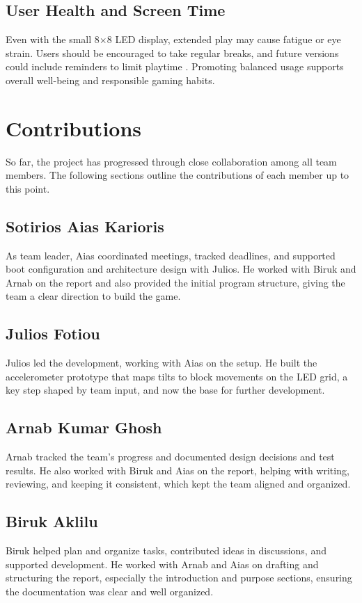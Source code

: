 \documentclass[12pt]{report}
\begin{document}
\section{User Health and Screen Time}
Even with the small 8$\times$8 LED display, extended play may cause fatigue or eye strain. Users should be encouraged to take regular breaks, and future versions could include reminders to limit playtime \cite{king2013videogame}. Promoting balanced usage supports overall well-being and responsible gaming habits.



\chapter{Contributions}
So far, the project has progressed through close collaboration among all team members. The following sections outline the contributions of each member up to this point.

\section{Sotirios Aias Karioris}
As team leader, Aias coordinated meetings, tracked deadlines, and supported boot configuration and architecture design with Julios. He worked with Biruk and Arnab on the report and also provided the initial program structure, giving the team a clear direction to build the game.

\section{Julios Fotiou}
Julios led the development, working with Aias on the setup. He built the accelerometer prototype that maps tilts to block movements on the LED grid, a key step shaped by team input, and now the base for further development.

\section{Arnab Kumar Ghosh}
Arnab tracked the team’s progress and documented design decisions and test results. He also worked with Biruk and Aias on the report, helping with writing, reviewing, and keeping it consistent, which kept the team aligned and organized. 


\section{Biruk Aklilu}
Biruk helped plan and organize tasks, contributed ideas in discussions, and supported development. He worked with Arnab and Aias on drafting and structuring the report, especially the introduction and purpose sections, ensuring the documentation was clear and well organized.
\end{document}
